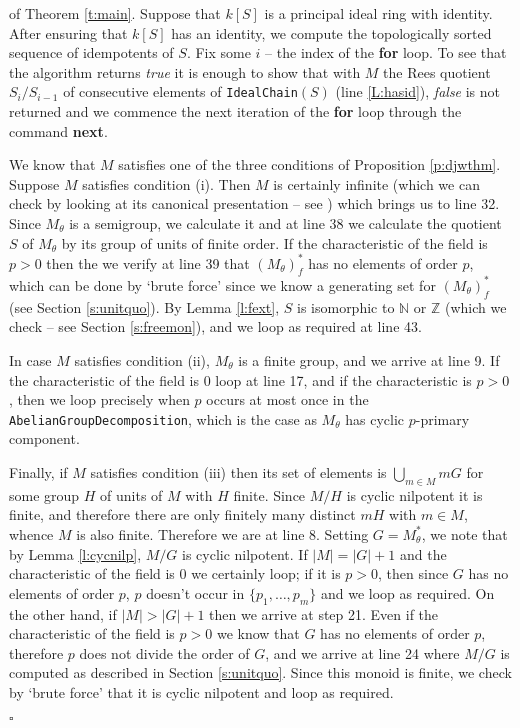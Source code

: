 \documentclass[12pt]{article}
\newenvironment{proofthm}{{\it Proof\/}}{$\square$\\}
\begin{document}
\begin{proofthm} of Theorem \ref{t:main}.
Suppose that $k[S]$ is a principal ideal ring with identity.
After ensuring that $k[S]$ has an identity, we 
compute the topologically sorted sequence of idempotents of $S$.
Fix some $i$ -- the index of the {\bf for} loop. To see that the 
algorithm returns \emph{true} it is enough to show that
with $M$ the Rees quotient $S_i/S_{i-1}$ of consecutive elements of 
{\tt IdealChain}$(S)$ (line \ref{L:hasid}), \emph{false} is not
returned and we commence the next iteration of the {\bf for} loop through
the command {\bf next}. 

We know that $M$ satisfies one of the
three conditions of  Proposition \ref{p:djwthm}. Suppose 
$M$ satisfies condition (i). Then $M$ is certainly infinite
(which we can check by looking at its canonical presentation --
see \cite{bRG99}) which brings us to line 32.
Since $M_\theta$ is a semigroup, we calculate it and at line 38 
we calculate the quotient $S$ of $M_\theta$ by its group of units of 
finite order.  If the characteristic of the field is $p > 0$ then
the we verify at line 39 that $(M_\theta)^*_f$ has no elements of order $p$, 
which can be done by `brute force' since we know a generating set
for  $(M_\theta)^*_f$ (see Section \ref{s:unitquo}).
By Lemma \ref{l:fext}, $S$ is isomorphic to 
$\mathbb{N}$ or $\mathbb{Z}$ (which we check -- see 
Section \ref{s:freemon}), and we loop as required at line 43.

In case $M$ satisfies condition (ii), $M_\theta$ is a finite group,
and we arrive at line 9. If the characteristic of the field is 
$0$ loop at line 17, and if the characteristic is $p > 0$, then
we loop precisely when $p$ occurs at most once in 
the {\tt AbelianGroupDecomposition}, which is the case
as $M_\theta$ has cyclic $p$-primary component.

Finally, if $M$ satisfies condition (iii) then its set 
of elements is $\bigcup_{m \in M}mG$ for some group $H$  of units of $M$
with $H$ finite. Since $M/H$ is cyclic nilpotent it is finite, and
therefore there are only finitely many distinct $mH$ with $m \in M$, whence
$M$ is also finite. Therefore we are at line 8. Setting $G = M_\theta^*$,
we note that by Lemma \ref{l:cycnilp}, $M/G$ is cyclic nilpotent.
If $|M| = |G| + 1$ and the characteristic of the field is $0$ we certainly
loop; if it is $p >0$, then since $G$ has no elements of order $p$, 
$p$ doesn't occur in $\{p_1, \ldots, p_m\}$ and we loop as required. 
On the other hand, if  $|M| > |G| + 1$ then we arrive at step 21. 
Even if the characteristic of the field is $p > 0$ we know that
$G$ has no elements of order $p$, therefore $p$ does not divide the
order of $G$, and we arrive at line 24 where 
$M/G$ is computed as described in Section \ref{s:unitquo}.
Since this monoid is finite, we check by `brute force' that it is 
cyclic nilpotent and loop as required.


\end{proofthm}
\end{document}
